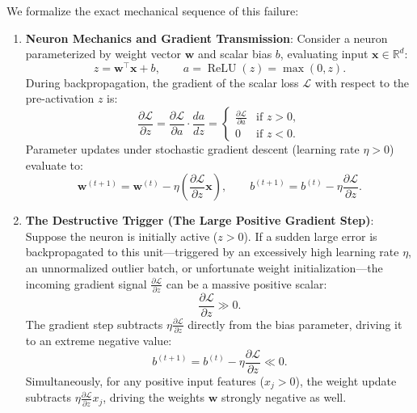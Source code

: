 We formalize the exact mechanical sequence of this failure:
\begin{enumerate}[leftmargin=*]
  \item \textbf{Neuron Mechanics and Gradient Transmission}: Consider a neuron parameterized by weight vector $\mathbf{w}$ and scalar bias $b$, evaluating input $\mathbf{x} \in \mathbb{R}^d$:
  \begin{equation}
  z = \mathbf{w}^\top \mathbf{x} + b, \qquad a = \operatorname{ReLU}(z) = \max(0, z).
  \end{equation}
  During backpropagation, the gradient of the scalar loss $\mathcal{L}$ with respect to the pre-activation $z$ is:
  \begin{equation}
  \frac{\partial \mathcal{L}}{\partial z} = \frac{\partial \mathcal{L}}{\partial a} \cdot \frac{da}{dz} = \begin{cases} \frac{\partial \mathcal{L}}{\partial a} & \text{if } z > 0, \\ 0 & \text{if } z < 0. \end{cases}
  \label{eq:relu_gradient_cases}
  \end{equation}
  Parameter updates under stochastic gradient descent (learning rate $\eta > 0$) evaluate to:
  \begin{equation}
  \mathbf{w}^{(t+1)} = \mathbf{w}^{(t)} - \eta \left( \frac{\partial \mathcal{L}}{\partial z} \mathbf{x} \right), \qquad b^{(t+1)} = b^{(t)} - \eta \frac{\partial \mathcal{L}}{\partial z}.
  \end{equation}

  \item \textbf{The Destructive Trigger (The Large Positive Gradient Step)}: Suppose the neuron is initially active ($z > 0$). If a sudden large error is backpropagated to this unit---triggered by an excessively high learning rate $\eta$, an unnormalized outlier batch, or unfortunate weight initialization---the incoming gradient signal $\frac{\partial \mathcal{L}}{\partial z}$ can be a massive positive scalar:
  \begin{equation}
  \frac{\partial \mathcal{L}}{\partial z} \gg 0.
  \end{equation}
  The gradient step subtracts $\eta \frac{\partial \mathcal{L}}{\partial z}$ directly from the bias parameter, driving it to an extreme negative value:
  \begin{equation}
  b^{(t+1)} = b^{(t)} - \eta \frac{\partial \mathcal{L}}{\partial z} \ll 0.
  \end{equation}
  Simultaneously, for any positive input features ($x_j > 0$), the weight update subtracts $\eta \frac{\partial \mathcal{L}}{\partial z} x_j$, driving the weights $\mathbf{w}$ strongly negative as well.


\end{enumerate}
